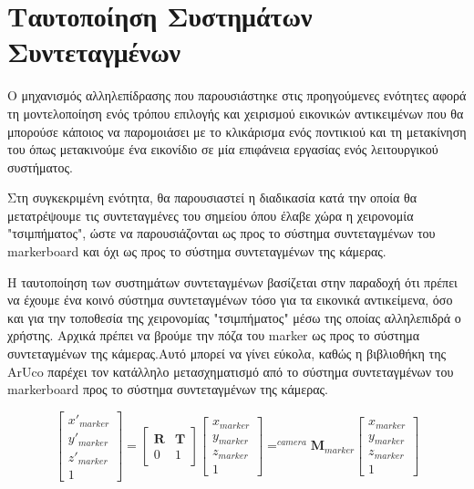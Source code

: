 \section{Tαυτοποίηση Συστημάτων Συντεταγμένων}



Ο μηχανισμός αλληλεπίδρασης που παρουσιάστηκε στις προηγούμενες ενότητες αφορά τη μοντελοποίηση ενός τρόπου επιλογής και χειρισμού εικονικών αντικειμένων που θα μπορούσε κάποιος να παρομοιάσει με το κλικάρισμα ενός ποντικιού και τη μετακίνηση του όπως μετακινούμε ένα εικονίδιο σε μία επιφάνεια εργασίας ενός λειτουργικού συστήματος.


Στη συγκεκριμένη ενότητα, θα παρουσιαστεί η διαδικασία κατά την οποία θα μετατρέψουμε τις συντεταγμένες του σημείου όπου έλαβε χώρα η χειρονομία "τσιμπήματος", ώστε να παρουσιάζονται ως προς το σύστημα συντεταγμένων του markerboard και όχι ως προς το σύστημα συντεταγμένων της κάμερας.


Η ταυτοποίηση των συστημάτων συντεταγμένων βασίζεται στην παραδοχή ότι πρέπει να έχουμε ένα κοινό σύστημα συντεταγμένων τόσο για τα εικονικά αντικείμενα, όσο και για την τοποθεσία της χειρονομίας "τσιμπήματος" μέσω της οποίας αλληλεπιδρά ο χρήστης. Αρχικά πρέπει να βρούμε την πόζα του marker ως προς το σύστημα συντεταγμένων της κάμερας.Αυτό μπορεί να γίνει εύκολα, καθώς η βιβλιοθήκη της ArUco παρέχει τον κατάλληλο μετασχηματισμό από το σύστημα συντεταγμένων του markerboard προς το σύστημα συντεταγμένων της κάμερας.



\begin{equation}
\begin{bmatrix}
x'_{marker} \\ y'_{marker} \\ z'_{marker} \\ 1
\end{bmatrix}
=
\begin{bmatrix}
\mathbf{R} & \mathbf{T}\\ 
0 & 1
\end{bmatrix}
\begin{bmatrix}
x_{marker} \\ y_{marker} \\ z_{marker} \\ 1
\end{bmatrix}
=
^{camera}\mathbf{M}_{marker}
\begin{bmatrix}
x_{marker} \\ y_{marker} \\ z_{marker} \\ 1
\end{bmatrix}
\end{equation}

